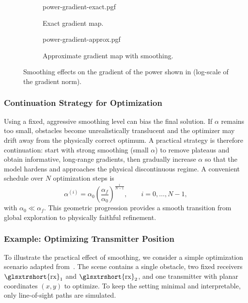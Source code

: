 \begin{figure}
\centering
\begin{subfigure}[t]{0.49\contentwidth}
\centering
{power-gradient-exact.pgf}
\caption{Exact gradient map.}
\end{subfigure}
\begin{subfigure}[t]{0.49\contentwidth}
\centering
{power-gradient-approx.pgf}
\caption{Approximate gradient map with smoothing.}
\end{subfigure}
\caption{Smoothing effects on the gradient of the power shown in  (log-scale of the gradient norm).}
\end{figure}

\subsubsection{Continuation Strategy for Optimization}

Using a fixed, aggressive smoothing level can bias the final solution. If $\alpha$ remains too small, obstacles become unrealistically translucent and the optimizer may drift away from the physically correct optimum. A practical strategy is therefore continuation: start with strong smoothing (small $\alpha$) to remove plateaus and obtain informative, long-range gradients, then gradually increase $\alpha$ so that the model hardens and approaches the physical discontinuous regime. A convenient schedule over $N$ optimization steps is
\begin{equation}
\alpha^{(i)} = \alpha_0\left(\frac{\alpha_f}{\alpha_0}\right)^{\frac{i}{N-1}}, \qquad i=0,\ldots,N-1,
\end{equation}
with $\alpha_0\ll\alpha_f$. This geometric progression provides a smooth transition from global exploration to physically faithful refinement.

\subsubsection{Example: Optimizing Transmitter Position}

To illustrate the practical effect of smoothing, we consider a simple optimization scenario adapted from~. The scene contains a single obstacle, two fixed receivers $\text{\glsxtrshort{rx}}_1$ and $\text{\glsxtrshort{rx}}_2$, and one transmitter with planar coordinates $(x,y)$ to optimize. To keep the setting minimal and interpretable, only \gls{line-of-sight} paths are simulated.


